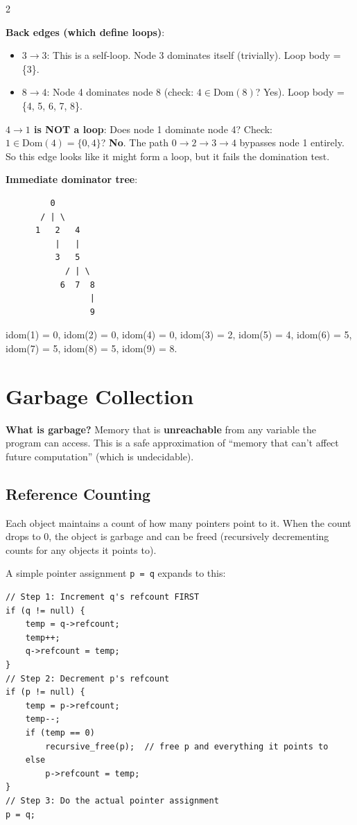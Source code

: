 \documentclass[9pt,landscape]{extarticle}
\begin{document}
\begin{multicols}{2}
\begin{exambox}
\textbf{Back edges (which define loops)}:
\begin{itemize}
  \item $3 \to 3$: This is a self-loop. Node 3 dominates itself (trivially). Loop body = \{3\}.
  \item $8 \to 4$: Node 4 dominates node 8 (check: $4 \in \text{Dom}(8)$? Yes). Loop body = \{4, 5, 6, 7, 8\}.
\end{itemize}

\textbf{$4 \to 1$ is NOT a loop}: Does node 1 dominate node 4? Check: $1 \in \text{Dom}(4) = \{0, 4\}$? \textbf{No}. The path $0 \to 2 \to 3 \to 4$ bypasses node 1 entirely. So this edge looks like it might form a loop, but it fails the domination test.

\textbf{Immediate dominator tree}:
\begin{lstlisting}
         0
       / | \
      1   2   4
          |   |
          3   5
            / | \
           6  7  8
                 |
                 9
\end{lstlisting}

idom(1) = 0, idom(2) = 0, idom(4) = 0, idom(3) = 2, idom(5) = 4, idom(6) = 5, idom(7) = 5, idom(8) = 5, idom(9) = 8.
\end{exambox}

\section{Garbage Collection}

\textbf{What is garbage?} Memory that is \textbf{unreachable} from any variable the program can access. This is a safe approximation of ``memory that can't affect future computation'' (which is undecidable).

\subsection{Reference Counting}

Each object maintains a count of how many pointers point to it. When the count drops to 0, the object is garbage and can be freed (recursively decrementing counts for any objects it points to).

\begin{exambox}[{Worked Example: Code Generated for p = q with Reference Counting}]
A simple pointer assignment \texttt{p = q} expands to this:
\begin{lstlisting}
// Step 1: Increment q's refcount FIRST
if (q != null) {
    temp = q->refcount;
    temp++;
    q->refcount = temp;
}
// Step 2: Decrement p's refcount
if (p != null) {
    temp = p->refcount;
    temp--;
    if (temp == 0)
        recursive_free(p);  // free p and everything it points to
    else
        p->refcount = temp;
}
// Step 3: Do the actual pointer assignment
p = q;
\end{lstlisting}


\end{exambox}
\end{multicols}
\end{document}
